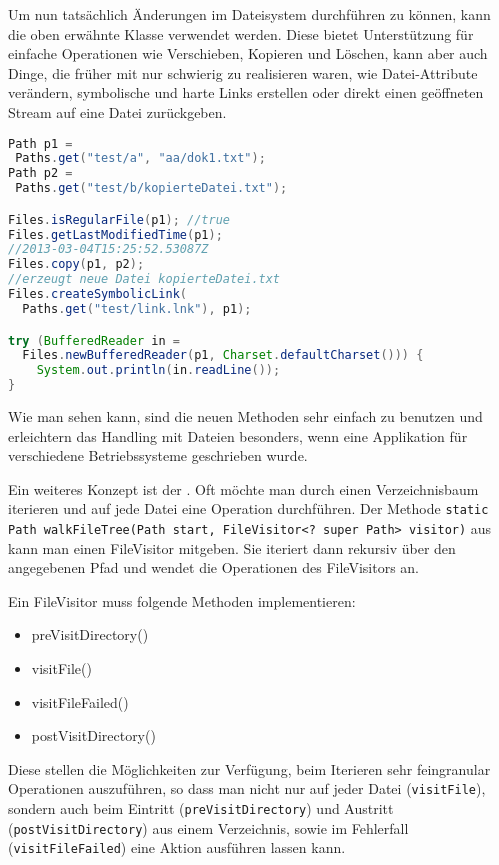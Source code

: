 \documentclass[times, 10pt,twocolumn]{article}
\begin{document}
Um nun tatsächlich Änderungen im Dateisystem durchführen zu können, kann die oben erwähnte Klasse  verwendet werden.
Diese bietet Unterstützung für einfache Operationen wie Verschieben, Kopieren und Löschen, kann aber auch Dinge, die früher
mit  nur schwierig zu realisieren waren, wie Datei-Attribute verändern, symbolische und harte Links erstellen oder
direkt einen geöffneten Stream auf eine Datei zurückgeben.\cite{b247nio2}
\begin{lstlisting}[language=java,breaklines=true]
Path p1 = 
 Paths.get("test/a", "aa/dok1.txt");
Path p2 = 
 Paths.get("test/b/kopierteDatei.txt");

Files.isRegularFile(p1); //true
Files.getLastModifiedTime(p1); 
//2013-03-04T15:25:52.53087Z
Files.copy(p1, p2); 
//erzeugt neue Datei kopierteDatei.txt
Files.createSymbolicLink(
  Paths.get("test/link.lnk"), p1);

try (BufferedReader in = 
  Files.newBufferedReader(p1, Charset.defaultCharset())) {
	System.out.println(in.readLine());
}
\end{lstlisting}
Wie man sehen kann, sind die neuen Methoden sehr einfach zu benutzen und erleichtern das Handling mit Dateien besonders,
wenn eine Applikation für verschiedene Betriebssysteme geschrieben wurde.

Ein weiteres Konzept ist der . Oft möchte man durch einen Verzeichnisbaum iterieren und auf jede Datei eine
Operation durchführen.
Der Methode \texttt{static Path walkFileTree(Path start, FileVisitor<? super Path> visitor)} aus  kann man einen
FileVisitor mitgeben. Sie iteriert dann rekursiv über den angegebenen Pfad und wendet die Operationen des FileVisitors an.

Ein FileVisitor muss folgende Methoden implementieren:
\begin{itemize}
  \item preVisitDirectory()
  \item visitFile()
  \item visitFileFailed()
  \item postVisitDirectory()
\end{itemize}
Diese stellen die Möglichkeiten zur Verfügung, beim Iterieren sehr feingranular Operationen auszuführen, so dass man nicht nur auf jeder
Datei (\texttt{visitFile}), sondern auch beim Eintritt (\texttt{preVisitDirectory}) und Austritt (\texttt{postVisitDirectory})
aus einem Verzeichnis, sowie im Fehlerfall (\texttt{visitFileFailed}) eine Aktion ausführen lassen kann.
\end{document}
